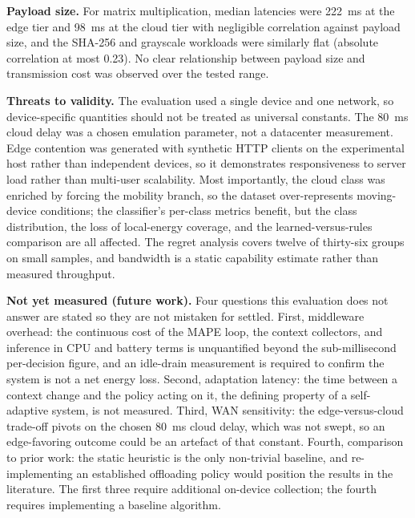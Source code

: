 \textbf{Payload size.}
For matrix multiplication, median latencies were 222~ms at the edge tier and
98~ms at the cloud tier with negligible correlation against payload size, and the
SHA-256 and grayscale workloads were similarly flat (absolute correlation at most
0.23). No clear relationship between payload size and transmission cost was
observed over the tested range.

\textbf{Threats to validity.}
The evaluation used a single device and one network, so device-specific
quantities should not be treated as universal constants. The 80~ms cloud delay
was a chosen emulation parameter, not a datacenter measurement. Edge contention
was generated with synthetic HTTP clients on the experimental host rather than
independent devices, so it demonstrates responsiveness to server load rather than
multi-user scalability. Most importantly, the cloud class was enriched by forcing
the mobility branch, so the dataset over-represents moving-device conditions; the
classifier's per-class metrics benefit, but the class distribution, the loss of
local-energy coverage, and the learned-versus-rules comparison are all affected.
The regret analysis covers twelve of thirty-six groups on small samples, and
bandwidth is a static capability estimate rather than measured throughput.

\textbf{Not yet measured (future work).}
Four questions this evaluation does not answer are stated so they are not mistaken
for settled. First, middleware overhead: the continuous cost of the MAPE loop,
the context collectors, and inference in CPU and battery terms is unquantified
beyond the sub-millisecond per-decision figure, and an idle-drain measurement is
required to confirm the system is not a net energy loss. Second, adaptation
latency: the time between a context change and the policy acting on it, the
defining property of a self-adaptive system, is not measured. Third, WAN
sensitivity: the edge-versus-cloud trade-off pivots on the chosen 80~ms cloud
delay, which was not swept, so an edge-favoring outcome could be an artefact of
that constant. Fourth, comparison to prior work: the static heuristic is the only
non-trivial baseline, and re-implementing an established offloading policy would
position the results in the literature. The first three require additional
on-device collection; the fourth requires implementing a baseline algorithm.

